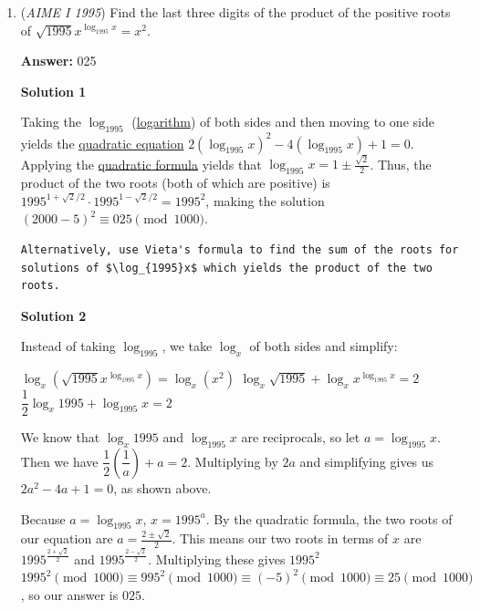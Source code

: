 \begin{enumerate}
 Alternatively, take the area of the first square and add $\,\frac{3}{4}$ of the areas of  the remaining squares. This results in $1+ \frac{3}{4}\left[\left(\frac{1}{2}\right)^2 + \ldots + \left(\frac{1}{16}\right)^2\right]$, which when simplified will produce the same answer.

 


	\item (\textit{AIME I 1995}) Find the last three digits of the product of the positive roots of
$\sqrt{1995}x^{\log_{1995}x}=x^2.$

 \textbf{Answer: }025



\textbf{Solution 1}

Taking the $\log_{1995}$ (\href{https://artofproblemsolving.com/wiki/index.php?title=Logarithm}{logarithm}) of both sides and then moving to one side yields the \href{https://artofproblemsolving.com/wiki/index.php?title=Quadratic\_equation}{quadratic equation} $2(\log_{1995}x)^2 - 4(\log_{1995}x)  + 1 = 0$. Applying the \href{https://artofproblemsolving.com/wiki/index.php?title=Quadratic\_formula}{quadratic formula} yields that $\log_{1995}x = 1 \pm \frac{\sqrt{2}}{2}$. Thus, the product of the two roots (both of which are positive) is $1995^{1+\sqrt{2}/2} \cdot 1995^{1 - \sqrt{2}/2} = 1995^2$, making the solution $(2000-5)^2 \equiv \boxed{025} \pmod{1000}$.

 \begin{verbatim}
Alternatively, use Vieta's formula to find the sum of the roots for solutions of $\log_{1995}x$ which yields the product of the two roots.
\end{verbatim}





\textbf{Solution 2}

Instead of taking $\log_{1995}$, we take $\log_x$ of both sides and simplify:

 $\log_x(\sqrt{1995}x^{\log_{1995}x})=\log_x(x^{2})$
$\log_x\sqrt{1995}+\log_x x^{\log_{1995}x}=2$
$\dfrac{1}{2} \log_x 1995 + \log_{1995} x = 2$

 We know that $\log_x 1995$ and $\log_{1995} x$ are reciprocals, so let $a=\log_{1995} x$.  Then we have $\dfrac{1}{2}\left(\dfrac{1}{a}\right) + a = 2$.  Multiplying by $2a$ and simplifying gives us $2a^2-4a+1=0$, as shown above.

 Because $a=\log_{1995} x$, $x=1995^a$. By the quadratic formula, the two roots of our equation are $a=\frac{2\pm\sqrt2}{2}$. This means our two roots in terms of $x$ are $1995^\frac{2+\sqrt2}{2}$ and $1995^\frac{2-\sqrt2}{2}.$ Multiplying these gives $1995^2$
$1995^2\pmod{1000}\equiv 995^2\pmod{1000}\equiv (-5)^2\pmod{1000}\equiv 25\pmod{1000}$, so our answer is $\boxed{025}$.


\end{enumerate}
